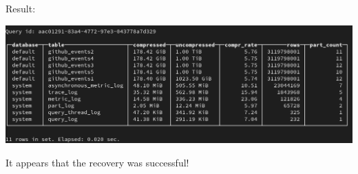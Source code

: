 Result:
\begin{center}
\includegraphics[width=.9\linewidth]{figures/clickhouse/restore3_tables.png}
\end{center}

It appears that the recovery was successful!
